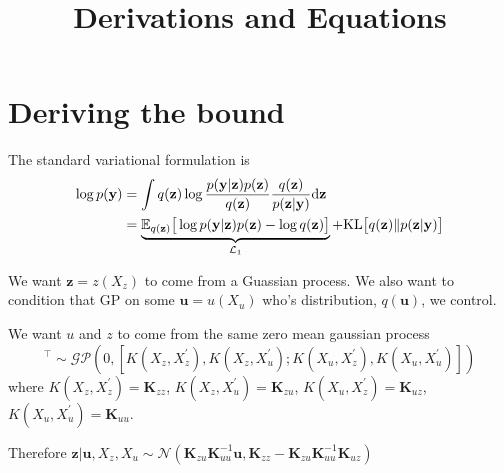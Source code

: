 \documentclass[12pt]{article}
\title{\textbf{Derivations and Equations}}
\date{}
\newcommand{\ub}{\mathbf{u}}
\newcommand{\zb}{\mathbf{z}}
\newcommand{\yb}{\mathbf{y}}
\newcommand{\dd}{\mathrm{d}}
\newcommand{\Lo}{\mathcal{L}_1}
\newcommand{\Kzz}{\mathbf{K}_{zz}}
\newcommand{\Kuu}{\mathbf{K}_{uu}}
\newcommand{\Kuz}{\mathbf{K}_{uz}}
\newcommand{\Kzu}{\mathbf{K}_{zu}}
\newcommand{\KL}{\mathrm{KL}}
\begin{document}
\maketitle


\section{Deriving the bound} %
\label{sec:derive_bound}
The standard variational formulation is
%
\begin{align}
    \log p(\yb) &= \int q(\zb)\log\frac{p(\yb|\zb)p(\zb)}{q(\zb)}\frac{q(\zb)}{p(\zb|\yb)} \dd\zb\notag\\
    &= \underbrace{\mathbb{E}_{q(\zb)}\big[ \log p(\yb|\zb)p(\zb) - \log q(\zb) \big]}_{\Lo} + \KL\big[ q(\zb)\Vert p(\zb|\yb) \big]\label{eq:logpy1}
\end{align}

We want $\zb = z(X_z)$ to come from a Guassian process. We also want to condition that GP on some $\ub=u(X_u)$ who's distribution, $q(\ub)$, we control.

We want $u$ and $z$ to come from the same zero mean gaussian process
%
\begin{equation}
    [z(X_z),u(X_u)]^\top \sim \mathcal{GP}(0,[K(X_z,X_z^\prime),K(X_z,X_u^\prime);K(X_u,X_z^\prime),K(X_u,X_u^\prime)])
\end{equation}
%
where $K(X_z,X_z^\prime) = \Kzz$, $K(X_z,X_u^\prime) = \Kzu$, $ K(X_u,X_z^\prime) = \Kuz$, $K(X_u,X_u^\prime) = \Kuu$.

Therefore $\zb|\ub,X_z,X_u \sim \mathcal{N}(\Kzu\Kuu^{-1}\ub, \Kzz - \Kzu\Kuu^{-1}\Kuz)$
\end{document}
